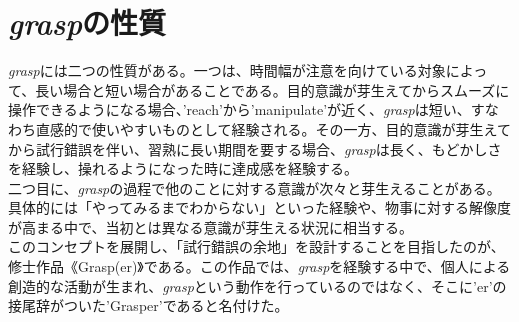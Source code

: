 \section{\textit{grasp}の性質}
\textit{grasp}には二つの性質がある。一つは、時間幅が注意を向けている対象によって、長い場合と短い場合があることである。目的意識が芽生えてからスムーズに操作できるようになる場合、'reach'から'manipulate'が近く、\textit{grasp}は短い、すなわち直感的で使いやすいものとして経験される。その一方、目的意識が芽生えてから試行錯誤を伴い、習熟に長い期間を要する場合、\textit{grasp}は長く、もどかしさを経験し、操れるようになった時に達成感を経験する。\\

二つ目に、\textit{grasp}の過程で他のことに対する意識が次々と芽生えることがある。具体的には「やってみるまでわからない」といった経験や、物事に対する解像度が高まる中で、当初とは異なる意識が芽生える状況に相当する。\\

このコンセプトを展開し、「試行錯誤の余地」を設計することを目指したのが、修士作品《Grasp(er)》である。この作品では、\textit{grasp}を経験する中で、個人による創造的な活動が生まれ、\textit{grasp}という動作を行っているのではなく、そこに'er'の接尾辞がついた'Grasper'であると名付けた。